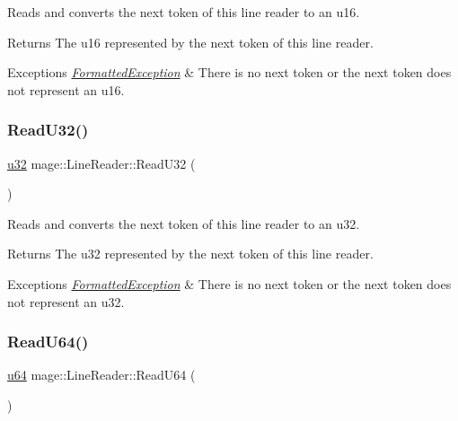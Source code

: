Reads and converts the next token of this line reader to an {\ttfamily u16}.

\begin{DoxyReturn}{Returns}
The {\ttfamily u16} represented by the next token of this line reader. 
\end{DoxyReturn}

\begin{DoxyExceptions}{Exceptions}
{\em \hyperlink{structmage_1_1_formatted_exception}{Formatted\+Exception}} & There is no next token or the next token does not represent an {\ttfamily u16}. \\
\hline
\end{DoxyExceptions}
\hypertarget{classmage_1_1_line_reader_adafd8e02ca717582e675d73ccd20ffbb}{}\label{classmage_1_1_line_reader_adafd8e02ca717582e675d73ccd20ffbb} 
\subsubsection{\texorpdfstring{Read\+U32()}{ReadU32()}}
{\footnotesize\ttfamily \hyperlink{namespacemage_af2b398bf98eb10351f49cad73fe2cc73}{u32} mage\+::\+Line\+Reader\+::\+Read\+U32 (\begin{DoxyParamCaption}{ }\end{DoxyParamCaption})\hspace{0.3cm}{\ttfamily [protected]}}

Reads and converts the next token of this line reader to an {\ttfamily u32}.

\begin{DoxyReturn}{Returns}
The {\ttfamily u32} represented by the next token of this line reader. 
\end{DoxyReturn}

\begin{DoxyExceptions}{Exceptions}
{\em \hyperlink{structmage_1_1_formatted_exception}{Formatted\+Exception}} & There is no next token or the next token does not represent an {\ttfamily u32}. \\
\hline
\end{DoxyExceptions}
\hypertarget{classmage_1_1_line_reader_a2ec680fb812d61e21cf0a4f0bbb35460}{}\label{classmage_1_1_line_reader_a2ec680fb812d61e21cf0a4f0bbb35460} 
\subsubsection{\texorpdfstring{Read\+U64()}{ReadU64()}}
{\footnotesize\ttfamily \hyperlink{namespacemage_aee97da48a07394dd617c9deb60ed2064}{u64} mage\+::\+Line\+Reader\+::\+Read\+U64 (\begin{DoxyParamCaption}{ }\end{DoxyParamCaption})\hspace{0.3cm}{\ttfamily [protected]}}

